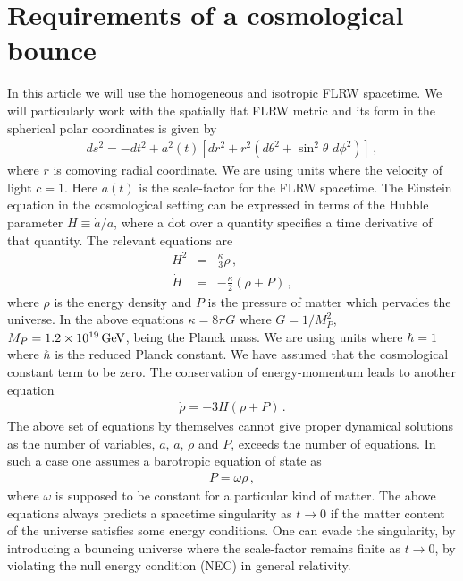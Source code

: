 \documentclass[24pt]{article}
\begin{document}
\section{Requirements of a cosmological bounce}

In this article we will use the homogeneous and isotropic FLRW
spacetime. We will particularly work with the spatially
flat FLRW metric and its form in the spherical polar coordinates is given by
\begin{eqnarray}
ds^2 = -dt^2 + a^2(t) \left[ dr^2 + r^2(d\theta^2 +
  \sin^2 \theta\,\,d\phi^2)\right]\,,
\label{sfrw}
\end{eqnarray}
where $r$ is comoving radial coordinate. We are using units where the
velocity of light $c=1$. Here $a(t)$ is the scale-factor for the FLRW
spacetime.  The Einstein equation in the cosmological setting can be
expressed in terms of the Hubble parameter $H\equiv \dot{a}/a$, where
a dot over a quantity specifies a time derivative of that quantity.
The relevant equations are
\begin{eqnarray}
H^2 &=&\frac{\kappa}{3}\rho\,,
\label{fried1}\\
\dot{H} &=&-\frac{\kappa}{2}(\rho + P)\,,
\label{fried2}
\end{eqnarray}
where $\rho$ is the energy density and $P$ is the pressure of 
matter which pervades the universe. In the above equations
$\kappa=8\pi G$ where $G=1/M_P^2$, $M_P=1.2 \times 10^{19}\,{\rm
  GeV}$, being the Planck mass. We are using units where $\hbar=1$
where $\hbar$ is the reduced Planck constant. We have assumed that the
cosmological constant term to be zero. The conservation of
energy-momentum leads to another equation
\begin{eqnarray}
\dot{\rho}=-3H(\rho + P)\,.
\label{encon}
\end{eqnarray}
The above set of equations by themselves cannot give proper dynamical
solutions as the number of variables, $a$, $\dot{a}$, $\rho$ and $P$,
exceeds the number of equations. In such a case one assumes a
barotropic equation of state as
\begin{eqnarray}
P=\omega \rho\,,
\label{beos}
\end{eqnarray}
where $\omega$ is supposed to be constant for a particular kind of
matter. The above equations always predicts a spacetime singularity as
$t \to 0$ if the matter content of the universe satisfies some energy
conditions. One can evade the singularity, by introducing a bouncing
universe where the scale-factor remains finite as $t \to 0$, by
violating the null energy condition (NEC) in general relativity.
\end{document}

